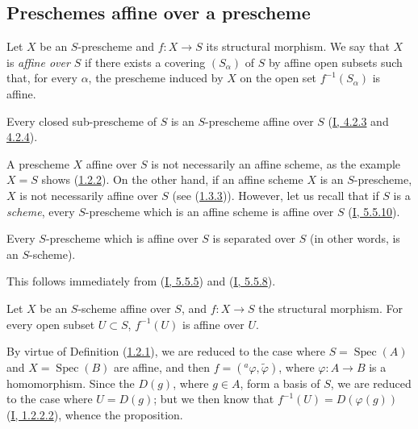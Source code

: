 \subsection{Preschemes affine over a prescheme}
\label{subsection:II.1.2}

\begin{definition}[1.2.1]
\label{II.1.2.1}
Let $X$ be an $S$-prescheme and $f:X\to S$ its structural morphism. We say
that $X$ is \emph{affine over $S$} if there exists a covering
$(S_\alpha)$ of $S$ by affine open subsets such that, for every $\alpha$, the
prescheme induced by $X$ on the open set $f^{-1}(S_\alpha)$ is affine.
\end{definition}

\begin{example}[1.2.2]
\label{II.1.2.2}
Every closed sub-prescheme of $S$ is an $S$-prescheme affine over $S$
(\hyperref[I.4.2.3]{I, 4.2.3} and
\hyperref[I.4.2.4]{4.2.4}).
\end{example}

\begin{remark}[1.2.3]
\label{II.1.2.3}
A prescheme $X$ affine over $S$ is not necessarily an affine scheme,
as the example $X=S$ shows (\hyperref[II.1.2.2]{1.2.2}).
On the other hand, if an affine scheme $X$ is an $S$-prescheme, $X$ is not
necessarily affine over
$S$ (see (\hyperref[II.1.3.3]{1.3.3})). However, let us recall that if
$S$ is a \emph{scheme}, every $S$-prescheme which is an affine scheme is
affine over $S$ (\hyperref[I.5.5.10]{I, 5.5.10}).
\end{remark}

\begin{proposition}[1.2.4]
\label{II.1.2.4}
Every $S$-prescheme which is affine over $S$ is separated over
$S$ (in other words, is an $S$-scheme).
\end{proposition}

This follows immediately from (\hyperref[I.5.5.5]{I, 5.5.5}) and
(\hyperref[I.5.5.8]{I, 5.5.8}).

\begin{proposition}[1.2.5]
\label{II.1.2.5}
Let $X$ be an $S$-scheme affine over $S$, and $f:X\to S$ the structural
morphism. For every open subset $U\subset S$, $f^{-1}(U)$ is affine over
$U$.
\end{proposition}

By virtue of Definition (\hyperref[II.1.2.1]{1.2.1}), we are reduced to the
case where $S=\operatorname{Spec}(A)$ and $X=\operatorname{Spec}(B)$ are
affine, and then $f=({}^a\varphi,\widetilde{\varphi})$, where
$\varphi:A\to B$ is a homomorphism. Since the $D(g)$, where $g\in A$, form a
basis of $S$, we are reduced to the case where $U=D(g)$; but we then know
that $f^{-1}(U)=D(\varphi(g))$ (\hyperref[I.1.2.2.2]{I, 1.2.2.2}), whence
the proposition.

